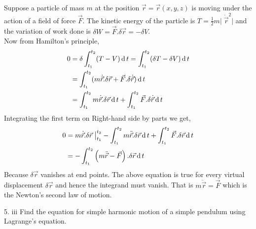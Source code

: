 \documentclass[12pt]{article}
\begin{document}
\begin{soln}
    Suppose a particle of mass \(m\) at the position \(\vec{r}=\vec{r}(x,y,z)\) is moving under the action of a field of force \(\vec{F}\). The kinetic energy of the particle is \(T=\frac{1}{2}m\vert\;\dot\vec{r}^2\vert\) and the variation of work done is \(\delta W=\vec{F}.\delta\vec{r}=-\delta V\).\\
    Now from Hamilton's principle,
    \begin{align*}
        0&=\delta\int_{t_1}^{t_2}(T-V)\,\mathrm{d}\, t=\int_{t_1}^{t_2}(\delta T-\delta V)\,\mathrm{d}\, t\\
        &=\int_{t_1}^{t_2} (m\dot{\vec{r}}.\delta \vec{r}+\vec{F}.\delta\dot{\vec{r}})\,\mathrm{d}\, t\\
        &=\int_{t_1}^{t_2} m\dot{\vec{r}}.\delta \vec{r}\,\mathrm{d}\, t+\int_{t_1}^{t_2}\vec{F}.\delta\dot{\vec{r}}\,\mathrm{d}\, t
    \end{align*}
    Integrating the first term on Right-hand side by parts we get,
    \begin{align*}
        0&=m\dot{\vec{r}}.\delta \vec{r}\;\big\vert_{t_1}^{t_2}-\int_{t_1}^{t_2}m\ddot{\vec{r}}.\delta \vec{r}\,\mathrm{d}\, t+\int_{t_1}^{t_2} \vec{F}.\delta\vec{r}\,\mathrm{d}\, t\\
        &=-\int_{t_1}^{t_2} \left( m\ddot{\vec{r}}-\vec{F} \right).\delta \vec{r}\,\mathrm{d}\, t
    \end{align*}
    Because \(\delta \vec{r}\) vanishes at end points. The above equation is true for every virtual displacement \(\delta \vec{r}\) and hence the integrand must vanish. That is \(m\ddot{\vec{r}}=\vec{F}\) which is the Newton's second law of motion.
\end{soln}
\begin{prob}{5. iii}
    Find the equation for simple harmonic motion of a simple pendulum using Lagrange's equation.
\end{prob}
\end{document}
